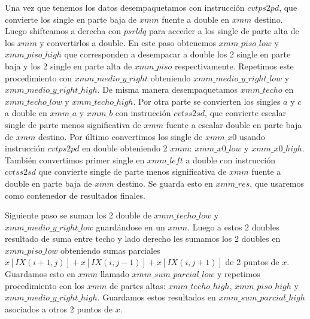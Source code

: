  Una vez que tenemos los datos desempaquetamos con instrucción $cvtps2pd$, que convierte los single
 en parte baja de $xmm$ fuente a double en $xmm$ destino. Luego shifteamos a derecha con $psrldq$ para
 acceder a los single de parte alta de los $xmm$ y convertirlos a double. En este paso obtenemos 
 $xmm\_piso\_low$ y $xmm\_piso\_high$ que corresponden a desempacar a double los 2 single en parte baja y los 
 2 single en parte alta de $xmm\_piso$ respectivamente.
Repetimos este procedimiento con $xmm\_medio\_y\_right$ obteniendo 
 $xmm\_medio\_y\_right\_low$ y $xmm\_medio\_y\_right\_high$. De misma manera desempaquetamos 
 $xmm\_techo$ en $xmm\_techo\_low$ y $xmm\_techo\_high$.
 Por otra parte se convierten los singles $a$ y $c$ a double en $xmm\_a$ y $xmm\_b$ con instrucción
 $cvtss2sd$, que convierte escalar single de parte menos significativa de $xmm$ fuente a
 escalar double en parte baja de $xmm$ destino. 
 Por último convertimos los single de $xmm\_x0$ usando instrucción $cvtps2pd$ en double obteniendo 2 
 $xmm$: $xmm\_x0\_low$ y $xmm\_x0\_high$. También convertimos primer single en $xmm\_left$ a double con instrucción $cvtss2sd$ que convierte single
 de parte menos significativa de $xmm$ fuente a double en parte baja de $xmm$ destino. Se guarda esto en
 $xmm\_res$, que usaremos como contenedor de resultados finales.

Siguiente paso se suman los 2 double de $xmm\_techo\_low$ y $xmm\_medio\_y\_right\_low$ guardándose en un $ xmm$. 
Luego a estos 2 doubles resultado de suma entre techo y lado derecho les sumamos los 2 doubles
 en $xmm\_piso\_low$ obteniendo sumas parciales $x[IX(i+1,j)]+x[IX(i,j-1)]+x[IX(i,j+1)]$ de 2 puntos de $x$.
 Guardamos esto en $xmm$ llamado $xmm\_sum\_parcial\_low$ y repetimos procedimiento con los $xmm$
 de partes altas: $xmm\_techo\_high$, $xmm\_piso\_high$ y $xmm\_medio\_y\_right\_high$. Guardamos
 estos resultados en $xmm\_sum\_parcial\_high$ asociados a otros 2 puntos de $x$.

